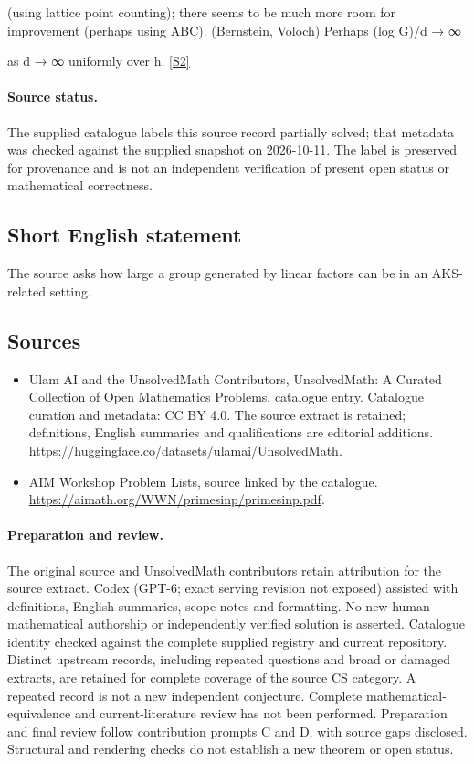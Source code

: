 \documentclass[11pt]{article}
\newcommand{\sref}[2]{\hyperlink{source:#1:#2}{[S#2]}}
\begin{document}
(using lattice point counting); there seems to be much more room for improvement (perhaps using ABC). (Bernstein, Voloch) Perhaps (log G)/d → ∞

as d → ∞ uniformly over h. \sref{statement}{2}
\paragraph{Source status.}
The supplied catalogue labels this source record partially solved; that metadata was checked against the supplied snapshot on 2026-10-11. The label is preserved for provenance and is not an independent verification of present open status or mathematical correctness.
\subsection{Short English statement}
The source asks how large a group generated by linear factors can be in an AKS-related setting.
\subsection{Sources}
\begin{itemize}
\item[\hypertarget{source:statement:1}{S1}] Ulam AI and the UnsolvedMath Contributors, UnsolvedMath: A Curated Collection of Open Mathematics Problems, catalogue entry. Catalogue curation and metadata: CC BY 4.0. The source extract is retained; definitions, English summaries and qualifications are editorial additions.
\url{https://huggingface.co/datasets/ulamai/UnsolvedMath}.
\item[\hypertarget{source:statement:2}{S2}] AIM Workshop Problem Lists, source linked by the catalogue.
\url{https://aimath.org/WWN/primesinp/primesinp.pdf}.
\end{itemize}
\paragraph{Preparation and review.}
The original source and UnsolvedMath contributors retain attribution for the source extract. Codex (GPT-6; exact serving revision not exposed) assisted with definitions, English summaries, scope notes and formatting. No new human mathematical authorship or independently verified solution is asserted. Catalogue identity checked against the complete supplied registry and current repository. Distinct upstream records, including repeated questions and broad or damaged extracts, are retained for complete coverage of the source CS category. A repeated record is not a new independent conjecture. Complete mathematical-equivalence and current-literature review has not been performed. Preparation and final review follow contribution prompts C and D, with source gaps disclosed. Structural and rendering checks do not establish a new theorem or open status.
\label{end:statement}
\end{document}
